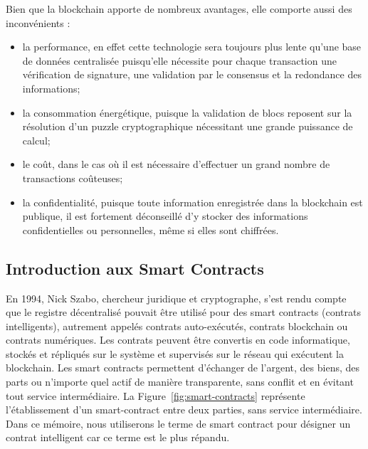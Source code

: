 \documentclass{tnreport}
\begin{document}
Bien que la blockchain apporte de nombreux avantages, elle comporte aussi des inconvénients :
\begin{itemize}
	\item la performance, en effet cette technologie sera toujours plus lente qu'une base de données centralisée puisqu'elle nécessite pour chaque transaction une vérification de signature, une validation par le consensus et la redondance des informations; 
	\item la consommation énergétique, puisque la validation de blocs reposent sur la résolution d'un puzzle cryptographique nécessitant une grande puissance de calcul; 
	\item le coût, dans le cas où il est nécessaire d'effectuer un grand nombre de transactions coûteuses;
	\item la confidentialité, puisque toute information enregistrée dans la blockchain est publique, il est fortement déconseillé d'y stocker des informations confidentielles ou personnelles, même si elles sont chiffrées.
\end{itemize}

\subsection{Introduction aux Smart Contracts}

En 1994, Nick Szabo, chercheur juridique et cryptographe, s'est rendu compte que le registre décentralisé pouvait être utilisé pour des smart contracts (contrats intelligents), autrement appelés contrats auto-exécutés, contrats blockchain ou contrats numériques.
Les contrats peuvent être convertis en code informatique, stockés et répliqués sur le système et supervisés sur le réseau qui exécutent la blockchain.
Les smart contracts permettent d'échanger de l'argent, des biens, des parts ou n'importe quel actif de manière transparente, sans conflit et en évitant tout service intermédiaire.
La Figure~\ref{fig:smart-contracts} représente l'établissement d'un smart-contract entre deux parties, sans service intermédiaire. Dans ce mémoire, nous utiliserons le terme de smart contract pour désigner un contrat intelligent car ce terme est le plus répandu.
\end{document}
